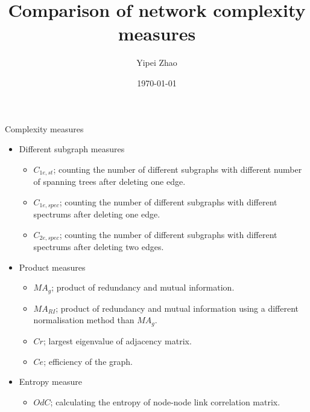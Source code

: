 \documentclass{beamer}
\title{Comparison of network complexity measures}
\author{Yipei Zhao}
\institute{Aston University}
\date{\today}
\begin{document}
    \frame{\titlepage}

    \begin{frame}{Complexity measures}
        \begin{itemize}
            \item Different subgraph measures
            \begin{itemize}
                \item $C_{1e,st}$; counting the number of different subgraphs with different number of spanning trees after deleting one edge.
                \item $C_{1e,spec}$; counting the number of different subgraphs with different spectrums after deleting one edge.
                \item $C_{2e,spec}$; counting the number of different subgraphs with different spectrums after deleting two edges.
            \end{itemize}
            \item Product measures
            \begin{itemize}
                \item $MA_g$; product of redundancy and mutual information.
                \item $MA_{RI}$; product of redundancy and mutual information using a different normalisation method than $MA_g$.
                \item $Cr$; largest eigenvalue of adjacency matrix.
                \item $Ce$; efficiency of the graph.
            \end{itemize}
            \item Entropy measure
            \begin{itemize}
                \item $OdC$; calculating the entropy of node-node link correlation matrix.
            \end{itemize}
        \end{itemize}
    \end{frame}
\end{document}
